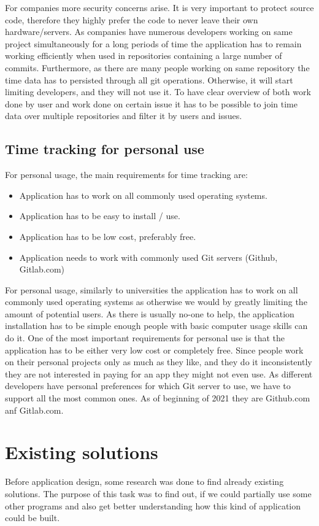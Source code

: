 For companies more security concerns arise.
It is very important to protect source code, therefore they highly prefer the code to never leave their own hardware/servers.
As companies have numerous developers working on same project simultaneously for a long periods of time the application has to
remain working efficiently when used in repositories containing a large number of commits.
Furthermore, as there are many people working on same repository the time data has to persisted through all git operations.
Otherwise, it will start limiting developers, and they will not use it.
To have clear overview of both work done by user and work done on certain issue it has to be possible to join time data over
multiple repositories and filter it by users and issues.

\subsection{Time tracking for personal use}\label{subsec:time-tracking-for-personal-use}
For personal usage, the main requirements for time tracking are:
\begin{itemize}
    \item Application has to work on all commonly used operating systems.
    \item Application has to be easy to install / use.
    \item Application has to be low cost, preferably free.
    \item Application needs to work with commonly used Git servers (Github, Gitlab.com)
\end{itemize}

For personal usage, similarly to universities the application has to work on all commonly used operating systems as otherwise we
would by greatly limiting the amount of potential users.
As there is usually no-one to help, the application installation has to be simple enough people with basic computer usage skills can do it.
One of the most important requirements for personal use is that the application has to be either very low cost or completely free.
Since people work on their personal projects only as much as they like, and they do it inconsistently they are not interested in paying for an app they might not even use.
As different developers have personal preferences for which Git server to use, we have to support all the most common ones.
As of beginning of 2021 they are Github.com anf Gitlab.com.


\section{Existing solutions}\label{sec:existing-solutions}
Before application design, some research was done to find already existing solutions.
The purpose of this task was to find out, if we could partially use some other programs and also get better understanding how
this kind of application could be built.


